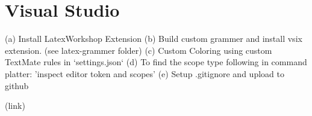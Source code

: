 \chapter{Visual Studio}

\begin{text-note}

(a) Install LatexWorkshop Extension
(b) Build custom grammer and install vsix extension. (see latex-grammer folder)
(c) Custom Coloring using custom TextMate rules in `settings.json`
(d) To find the scope type following in command platter: 'inspect editor token and scopes'
(e) Setup .gitignore and upload to github

\end{text-note}

\begin{text-note}(link)
\end{text-note}

